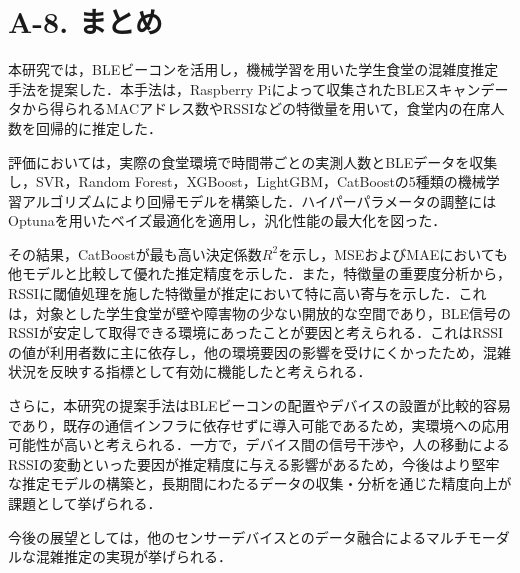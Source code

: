 \section*{A-8. まとめ}

本研究では，BLEビーコンを活用し，機械学習を用いた学生食堂の混雑度推定手法を提案した．本手法は，Raspberry Piによって収集されたBLEスキャンデータから得られるMACアドレス数やRSSIなどの特徴量を用いて，食堂内の在席人数を回帰的に推定した．

評価においては，実際の食堂環境で時間帯ごとの実測人数とBLEデータを収集し，SVR，Random Forest，XGBoost，LightGBM，CatBoostの5種類の機械学習アルゴリズムにより回帰モデルを構築した．ハイパーパラメータの調整にはOptunaを用いたベイズ最適化を適用し，汎化性能の最大化を図った．

その結果，CatBoostが最も高い決定係数$R^2$を示し，MSEおよびMAEにおいても他モデルと比較して優れた推定精度を示した．また，特徴量の重要度分析から，RSSIに閾値処理を施した特徴量が推定において特に高い寄与を示した．これは，対象とした学生食堂が壁や障害物の少ない開放的な空間であり，BLE信号のRSSIが安定して取得できる環境にあったことが要因と考えられる．これはRSSIの値が利用者数に主に依存し，他の環境要因の影響を受けにくかったため，混雑状況を反映する指標として有効に機能したと考えられる．

さらに，本研究の提案手法はBLEビーコンの配置やデバイスの設置が比較的容易であり，既存の通信インフラに依存せずに導入可能であるため，実環境への応用可能性が高いと考えられる．一方で，デバイス間の信号干渉や，人の移動によるRSSIの変動といった要因が推定精度に与える影響があるため，今後はより堅牢な推定モデルの構築と，長期間にわたるデータの収集・分析を通じた精度向上が課題として挙げられる．

今後の展望としては，他のセンサーデバイスとのデータ融合によるマルチモーダルな混雑推定の実現が挙げられる．
